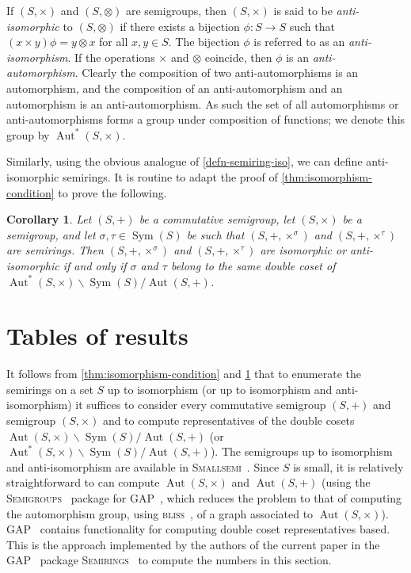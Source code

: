 \documentclass{article}
\theoremstyle{definition}
\theoremstyle{plain}
\newtheorem{cor}[defn]{Corollary}
\newcommand{\GAP}{\textsc{GAP}~\cite{GAP4}\xspace}
\newcommand{\Smallsemi}{\textsc{Smallsemi}~\cite{Smallsemi}\xspace}
\newcommand{\Semigroups}{\textsc{Semigroups}~\cite{Semigroups}\xspace}
\newcommand{\Semirings}{\textsc{Semirings}~\cite{Semirings}\xspace}
\newcommand{\bliss}{\textsc{bliss}~\cite{bliss, junttila2007}\xspace}
\newcommand{\Sym}{\operatorname{Sym}}
\newcommand{\Aut}{\operatorname{Aut}}
\begin{document}
If $(S, \times)$ and $(S, \otimes)$ are semigroups, then $(S, \times)$ is said
to be \textit{anti-isomorphic} to $(S, \otimes)$ if there exists a bijection
$\phi: S \to S$ such that $(x\times y)\phi = y\otimes x$ for all $x, y\in S$.
The bijection $\phi$ is referred to as an \textit{anti-isomorphism}. If the
operations $\times$ and $\otimes$ coincide, then $\phi$ is an
\textit{anti-automorphism}. Clearly the composition of two anti-automorphisms
is an automorphism, and the composition of an anti-automorphism and an
automorphism is an anti-automorphism. As such the set of all automorphisms or
anti-automorphisms forms a group under composition of functions; we denote this
group by $\Aut^*(S, \times)$.

Similarly, using the obvious analogue of \cref{defn-semiring-iso}, we can
define anti-isomorphic semirings. It is routine to adapt the proof of
\cref{thm:isomorphism-condition} to prove the following.

\begin{cor}
  \label{cor:equiv-condition}
  Let \((S, +)\) be a commutative semigroup, let \((S, \times)\) be a
  semigroup, and let \(\sigma, \tau\in\Sym(S)\) be such that $(S, +, \times ^
  \sigma)$ and $(S, +, \times ^ \tau)$ are semirings. Then \((S, +, \times ^
  \sigma)\) and \((S, +, \times^\tau)\) are isomorphic or anti-isomorphic if
  and only if \(\sigma\) and \(\tau\) belong to the same double coset of
  \(\Aut^*(S, \times) \backslash \Sym(S) / \Aut(S, +)\).
\end{cor}

\section{Tables of results}

It follows from \cref{thm:isomorphism-condition} and \cref{cor:equiv-condition}
that to enumerate the semirings on a set $S$ up to isomorphism (or up to
isomorphism and anti-isomorphism) it suffices to consider every commutative
semigroup $(S, +)$ and semigroup $(S, \times)$ and to compute representatives
of the double cosets \(\Aut(S, \times) \backslash \Sym(S) / \Aut(S, +)\) (or
\(\Aut^*(S, \times) \backslash \Sym(S) / \Aut(S, +)\)). The semigroups up to
isomorphism and anti-isomorphism are available in \Smallsemi.  Since $S$ is
small, it is relatively straightforward to can compute $\Aut(S, \times)$ and
$\Aut(S, +)$ (using the \Semigroups package for \GAP, which reduces the problem
  to that of computing the automorphism group, using \bliss, of a graph
associated to $\Aut(S, \times)$). \GAP contains functionality for computing
double coset representatives based.
This is the approach implemented by the authors of the current paper in the
\GAP package \Semirings to compute the numbers in this section.
\end{document}
